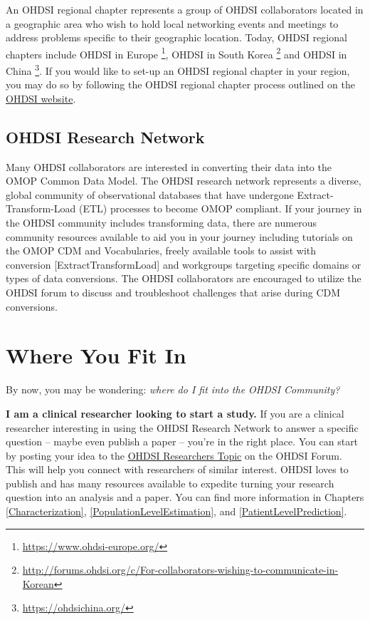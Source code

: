 \documentclass[11pt]{book}
\let\rmarkdownfootnote\footnote%
\def\footnote{\protect\rmarkdownfootnote}
\theoremstyle{definition}
\theoremstyle{definition}
\theoremstyle{definition}
\theoremstyle{remark}
\begin{document}
An OHDSI regional chapter represents a group of OHDSI collaborators located in a geographic area who wish to hold local networking events and meetings to address problems specific to their geographic location. Today, OHDSI regional chapters include OHDSI in Europe \footnote{\url{https://www.ohdsi-europe.org/}}, OHDSI in South Korea \footnote{\url{http://forums.ohdsi.org/c/For-collaborators-wishing-to-communicate-in-Korean}} and OHDSI in China \footnote{\url{https://ohdsichina.org/}}. If you would like to set-up an OHDSI regional chapter in your region, you may do so by following the OHDSI regional chapter process outlined on the \href{https://www.ohdsi.org/who-we-are/regional-chapters}{OHDSI website}. 

\hypertarget{ohdsi-research-network}{%
\subsection{OHDSI Research Network}\label{ohdsi-research-network}}

Many OHDSI collaborators are interested in converting their data into the OMOP Common Data Model. The OHDSI research network represents a diverse, global community of observational databases that have undergone Extract-Transform-Load (ETL) processes to become OMOP compliant. If your journey in the OHDSI community includes transforming data, there are numerous community resources available to aid you in your journey including tutorials on the OMOP CDM and Vocabularies, freely available tools to assist with conversion {[}ExtractTransformLoad{]} and workgroups targeting specific domains or types of data conversions. The OHDSI collaborators are encouraged to utilize the OHDSI forum to discuss and troubleshoot challenges that arise during CDM conversions.

\hypertarget{where-you-fit-in}{%
\section{Where You Fit In}\label{where-you-fit-in}}

By now, you may be wondering: \emph{where do I fit into the OHDSI Community?}

\textbf{I am a clinical researcher looking to start a study.} If you are a clinical researcher interesting in using the OHDSI Research Network to answer a specific question -- maybe even publish a paper -- you're in the right place. You can start by posting your idea to the \href{https://forums.ohdsi.org/c/researchers}{OHDSI Researchers Topic} on the OHDSI Forum. This will help you connect with researchers of similar interest. OHDSI loves to publish and has many resources available to expedite turning your research question into an analysis and a paper. You can find more information in Chapters \ref{Characterization}, \ref{PopulationLevelEstimation}, and \ref{PatientLevelPrediction}.
\end{document}
